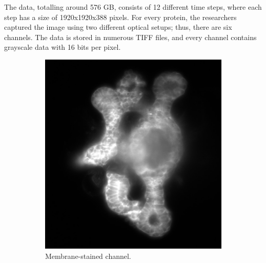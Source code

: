 \documentclass[
  digital,     %
  oneside,     %
  nosansbold,  %
  nocolorbold, %
  lof,         %
  lot,         %
]{fithesis4}
\begin{document}
The data, totalling around 576 GB, consists of 12 different time steps, where
each step has a size of 1920x1920x388 pixels. For every protein, the researchers
captured the image using two different optical setups; thus, there are six
channels. The data is stored in numerous TIFF files, and every channel contains
grayscale data with 16 bits per pixel.
\begin{figure}
    \begin{subfigure}[t]{0.4\textwidth}
        \centering
        \includegraphics[width=\textwidth]{resources/C3-t006-200-scaled.jpg}
        \caption{Membrane-stained channel.}
        \label{fig:data_example_membraine}
    \end{subfigure}
    \begin{subfigure}[t]{0.4\textwidth}
        \centering

\end{subfigure}
\end{figure}
\end{document}
